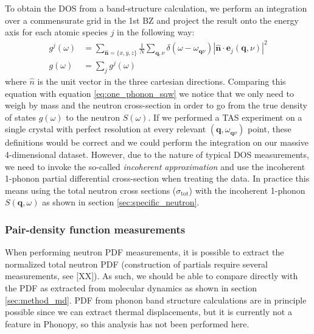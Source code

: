 To obtain the DOS from a band-structure calculation, we perform an integration over a commensurate grid in the 1st BZ and project the result onto the energy axis for each atomic species $j$ in the following way:
%
\begin{align*}
	g^j (\omega) &= \sum_{\bm{\hat{n}}=\{x,y,z\}} \frac{1}{N} \sum_{\bm{q},\nu} \delta(\omega - \omega_{\bm{q}\nu}) \left| \bm{\hat{n}} \cdot \bm{e}_j(\bm{q},\nu) \right| ^2 \\
	g(\omega) &= \sum_j g^j(\omega)
\end{align*}
%
where $\hat{n}$ is the unit vector in the three cartesian directions. Comparing this equation with equation \eqref{eq:one_phonon_sqw} we notice that we only need to weigh by mass and the neutron cross-section in order to go from the true density of states $g(\omega)$ to the neutron $S(\omega)$. If we performed a TAS experiment on a single crystal with perfect resolution at every relevant $(\bm{q},\omega_{\bm{q}\nu})$ point, these definitions would be correct and we could perform the integration on our massive 4-dimensional dataset. However, due to the nature of typical DOS measurements, we need to invoke the so-called \emph{incoherent approximation} and use the incoherent 1-phonon partial differential cross-section when treating the data. In practice this means using the total neutron cross sections ($\sigma_\text{tot}$) with the incoherent 1-phonon $S(\bm{q},\omega)$ as shown in section \ref{sec:specific_neutron}.

\subsubsection{Pair-density function measurements}
When performing neutron PDF measurements, it is possible to extract the normalized total neutron PDF (construction of partials require several measurements, see [XX]). As such, we should be able to compare directly with the PDF as extracted from molecular dynamics as shown in section \ref{sec:method_md}. PDF from phonon band structure calculations are in principle possible since we can extract thermal displacements, but it is currently not a feature in Phonopy, so this analysis has not been performed here. 
